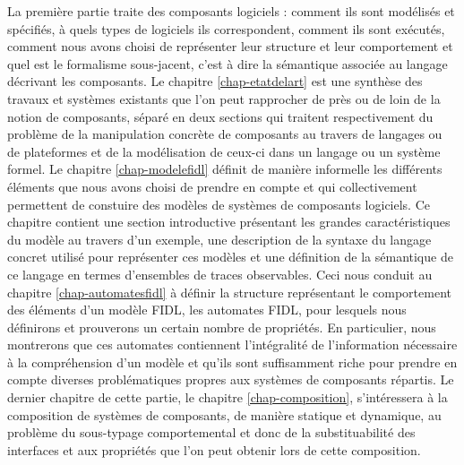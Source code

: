 La premi\`ere partie
traite des composants logiciels : comment ils sont
mod\'elis\'es et sp\'ecifi\'es, \`a quels types de logiciels ils
correspondent, comment ils sont ex\'ecut\'es, comment nous avons
choisi de repr\'esenter leur structure et leur comportement et quel
est le formalisme sous-jacent, c'est \`a dire la s\'emantique
associ\'ee au langage d\'ecrivant les composants. Le chapitre
\ref{chap-etatdelart} est une synth\`ese des travaux et syst\`emes
existants que l'on peut rapprocher de pr\`es ou de loin de la notion
de composants, s\'epar\'e en deux sections qui traitent
respectivement du probl\`eme de la manipulation concr\`ete de composants au travers de
langages ou de plateformes et de la mod\'elisation de ceux-ci dans un
langage ou un syst\`eme formel. Le chapitre \ref{chap-modelefidl}
d\'efinit de mani\`ere informelle les diff\'erents \'el\'ements
que nous avons choisi de prendre en compte et qui collectivement
permettent de constuire des mod\`eles de syst\`emes de composants
logiciels. Ce chapitre contient une section introductive pr\'esentant
les grandes caract\'eristiques du mod\`ele au travers d'un exemple,
une description de la syntaxe du langage concret utilis\'e pour
repr\'esenter ces mod\`eles et une d\'efinition de la s\'emantique
de ce langage en termes d'ensembles de traces observables. Ceci nous
conduit au chapitre \ref{chap-automatesfidl} \`a d\'efinir la
structure repr\'esentant le comportement des \'el\'ements d'un
mod\`ele FIDL, les automates FIDL, pour lesquels nous d\'efinirons
et prouverons un certain nombre de propri\'et\'es. En particulier,
nous montrerons que ces automates contiennent l'int\'egralit\'e de
l'information n\'ecessaire \`a la compr\'ehension d'un mod\`ele et
qu'ils sont suffisamment riche pour prendre en compte diverses
probl\'ematiques propres aux syst\`emes de composants r\'epartis.
Le dernier chapitre de cette partie, le chapitre
\ref{chap-composition}, s'int\'eressera \`a la composition de
syst\`emes de composants, de mani\`ere statique et dynamique, au
probl\`eme du sous-typage comportemental et donc de la
substituabilit\'e des interfaces et aux
propri\'et\'es que l'on peut obtenir lors de cette composition.

